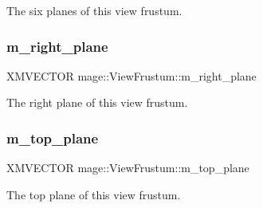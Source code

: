 The six planes of this view frustum. \hypertarget{structmage_1_1_view_frustum_a95718f7a8fdd743872b93904e99b4268}{}\label{structmage_1_1_view_frustum_a95718f7a8fdd743872b93904e99b4268} 
\subsubsection{\texorpdfstring{m\+\_\+right\+\_\+plane}{m\_right\_plane}}
{\footnotesize\ttfamily X\+M\+V\+E\+C\+T\+OR mage\+::\+View\+Frustum\+::m\+\_\+right\+\_\+plane}

The right plane of this view frustum. \hypertarget{structmage_1_1_view_frustum_a82076a48eaa7ed305a0a1c43246f93d4}{}\label{structmage_1_1_view_frustum_a82076a48eaa7ed305a0a1c43246f93d4} 
\subsubsection{\texorpdfstring{m\+\_\+top\+\_\+plane}{m\_top\_plane}}
{\footnotesize\ttfamily X\+M\+V\+E\+C\+T\+OR mage\+::\+View\+Frustum\+::m\+\_\+top\+\_\+plane}

The top plane of this view frustum. 